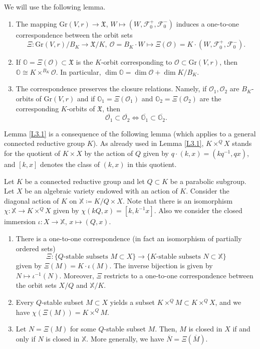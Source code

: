 \documentclass[ALCO,Unicode]{cedram}
\newcommand{\flag}{\mathcal{F}}
\newcommand{\Xorbit}{\mathbb{O}}
\newcommand{\Gorbit}{\mathcal{O}}
\newcommand{\Xfv}{\mathfrak{X}}
\newcommand{\Grass}{\mathrm{Gr}}
\begin{document}
\label{section-3.1}

We will use the following lemma.


\begin{lemma}
\label{L3.1}
\begin{enumerate}
\item The mapping $\Grass(V,r)\to\Xfv$, $W\mapsto (W,\flag_0^+,\flag_0^-)$ induces a one-to-one correspondence between the orbit sets
\[\Xi:\Grass(V,r)/B_K\to \Xfv/K,\ \Gorbit=B_K\cdot W\mapsto \Xi(\Gorbit)=K\cdot (W,\flag_0^+,\flag_0^-).\]
\item If $\Xorbit=\Xi(\Gorbit)\subset\Xfv$ is the $K$-orbit corresponding to $\Gorbit\subset\Grass(V,r)$, then $\Xorbit\cong K\times^{B_K}\Gorbit$. In particular, $\dim\Xorbit=\dim\Gorbit+\dim K/B_K$.
\item The correspondence preserves the closure relations. Namely, if $\Gorbit_1,\Gorbit_2$ are $B_K$-orbits of $\Grass(V,r)$ and if $\Xorbit_1=\Xi(\Gorbit_1)$ and $\Xorbit_2=\Xi(\Gorbit_2)$ are the corresponding $K$-orbits of $\Xfv$, then
\[\overline{\Gorbit_1}\subset\overline{\Gorbit_2}\iff \overline{\Xorbit_1}\subset\overline{\Xorbit_2}.\]
\end{enumerate}
\end{lemma}

Lemma \ref{L3.1} is a consequence of the following lemma (which applies to a general connected reductive group $K$).
As already used in Lemma \ref{L3.1}, $K\times^QX$ stands for the quotient of $K\times X$ by the action of $Q$ given by $q\cdot(k,x)=(kq^{-1},qx)$, and $[k,x]$ denotes the class of $(k,x)$ in this quotient. %

\begin{lemma}
\label{L3.2-new}
Let $K$ be a connected reductive group and let $Q\subset K$ be a parabolic subgroup. Let $X$ be an algebraic variety endowed with an action of $K$. Consider the diagonal action of $K$ on $\mathbb{X}\coloneqq K/Q\times X$.
Note that there is an isomorphism  $\chi:\mathbb{X}\to K\times^QX$ given by $\chi(kQ,x)=[k,k^{-1}x]$.
Also we consider the closed immersion $\iota:X\to\mathbb{X}$, $x\mapsto(Q,x)$.
\begin{enumerate}
\item There is a one-to-one correspondence (in fact an isomorphism of partially ordered sets)
\[\Xi:\{\mbox{$Q$-stable subsets $M\subset X$}\}\to\{\mbox{$K$-stable subsets $N\subset\mathbb{X}$}\}\]
given by $\Xi(M)=K\cdot\iota(M)$. The inverse bijection is given by $N\mapsto\iota^{-1}(N)$. Moreover, $\Xi$ restricts to a one-to-one correspondence between the orbit sets $X/Q$ and $\mathbb{X}/K$.
\item Every $Q$-stable subset $M\subset X$ yields a subset $K\times^QM\subset K\times^QX$, and we have $\chi(\Xi(M))=K\times^QM$.
\item Let $N=\Xi(M)$ for some $Q$-stable subset $M$. Then, $M$ is closed in $X$ if and only if $N$ is closed in $\mathbb{X}$. More generally, we have $\overline{N}=\Xi(\overline{M})$.
\end{enumerate}
\end{lemma}
\end{document}
